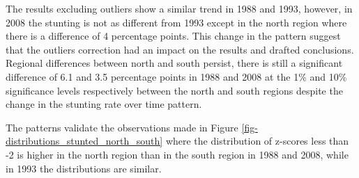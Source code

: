 \documentclass[
  letterpaper,
  DIV=11,
  numbers=noendperiod]{scrartcl}
\begin{document}
The results excluding outliers show a similar trend in 1988 and 1993,
however, in 2008 the stunting is not as different from 1993 except in
the north region where there is a difference of 4 percentage points.
This change in the pattern suggest that the outliers correction had an
impact on the results and drafted conclusions. Regional differences
between north and south persist, there is still a significant difference
of 6.1 and 3.5 percentage points in 1988 and 2008 at the 1\% and 10\%
significance levels respectively between the north and south regions
despite the change in the stunting rate over time pattern.

The patterns validate the observations made in Figure
\ref{fig-distributions_stunted_north_south} where the distribution of
z-scores less than -2 is higher in the north region than in the south
region in 1988 and 2008, while in 1993 the distributions are similar.
\end{document}
